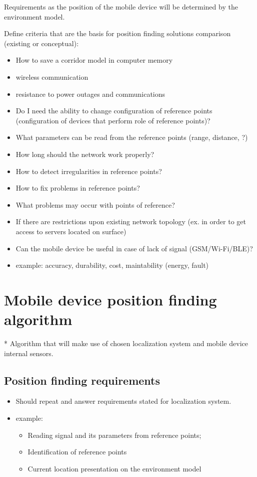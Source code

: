 \documentclass[../main.tex]{subfiles}
\begin{document}
Requirements as the position of the mobile device will be determined by the environment model.

Define criteria that are the basis for position finding solutions comparison (existing or conceptual):
\begin{itemize}
	\item How to save a corridor model in computer memory
	\item wireless communication
	\item resistance to power outages and communications
	\item Do I need the ability to change configuration of reference points (configuration of devices that perform role of reference points)?
	\item What parameters can be read from the reference points (range, distance, ?)
	\item How long should the network work properly?
	\item How to detect irregularities in reference points?
	\item How to fix problems in reference points?
	\item What problems may occur with points of reference?
	\item If there are restrictions upon existing network topology (ex. in order to get access to servers located on surface)
	\item Can the mobile device be useful in case of lack of signal (GSM/Wi-Fi/BLE)?
	\item example: accuracy, durability, cost, maintability (energy, fault)
\end{itemize}

\chapter{Mobile device position finding algorithm}
* Algorithm that will make use of chosen localization system and mobile device internal sensors.

\section{Position finding requirements} %
\label{sec:position_finding_requirements}
\begin{itemize}
	\item Should repeat and answer requirements stated for localization system.
	\item example:
	\begin{itemize}
		\item Reading signal and its parameters from reference points;
		\item Identification of reference points
		\item Current location presentation on the environment model
	\end{itemize}
\end{itemize}
\end{document}

